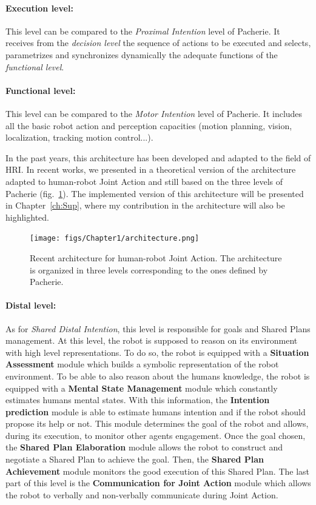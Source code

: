 \documentclass[english,a4paper,11pt,twoside]{StyleThese}
\begin{document}
\paragraph{Execution level:}
This level can be compared to the \textit{Proximal Intention} level of Pacherie. It receives from the \textit{decision level} the sequence of actions to be executed and selects, parametrizes and synchronizes dynamically the adequate functions of the \textit{functional level}.

\paragraph{Functional level:}
This level can be compared to the \textit{Motor Intention} level of Pacherie. It includes all the basic robot action and perception capacities (motion planning, vision, localization, tracking motion control...). 

\bigskip
In the past years, this architecture has been developed and adapted to the field of HRI. In recent works, we presented in \cite{devin2016some} a theoretical version of the architecture adapted to human-robot Joint Action and still based on the three levels of Pacherie (fig.~\ref{fig:ArchiThreeLevels}). The implemented version of this architecture will be presented in Chapter~\ref{ch:Sup}, where my contribution in the architecture will also be highlighted.

\begin{figure}[!h]
	\centering
    \texttt{[image: figs/Chapter1/architecture.png]}
    \caption{Recent architecture for human-robot Joint Action. The architecture is organized in three levels corresponding to the ones defined by Pacherie.}
    \label{fig:ArchiThreeLevels}
\end{figure}

\paragraph{Distal level:}
As for \textit{Shared Distal Intention}, this level is responsible for goals and Shared Plans management. At this level, the robot is supposed to reason on its environment with high level representations. To do so, the robot is equipped with a \textbf{Situation Assessment} module which builds a symbolic representation of the robot environment. To be able to also reason about the humans knowledge, the robot is equipped with a \textbf{Mental State Management} module which constantly estimates humans mental states. With this information, the \textbf{Intention prediction} module is able to estimate humans intention and if the robot should propose its help or not. This module determines the goal of the robot and allows, during its execution, to monitor other agents engagement. Once the goal chosen, the \textbf{Shared Plan Elaboration} module allows the robot to construct and negotiate a Shared Plan to achieve the goal. Then, the \textbf{Shared Plan Achievement} module monitors the good execution of this Shared Plan. The last part of this level is the \textbf{Communication for Joint Action} module which allows the robot to verbally and non-verbally communicate during Joint Action. 
\end{document}
